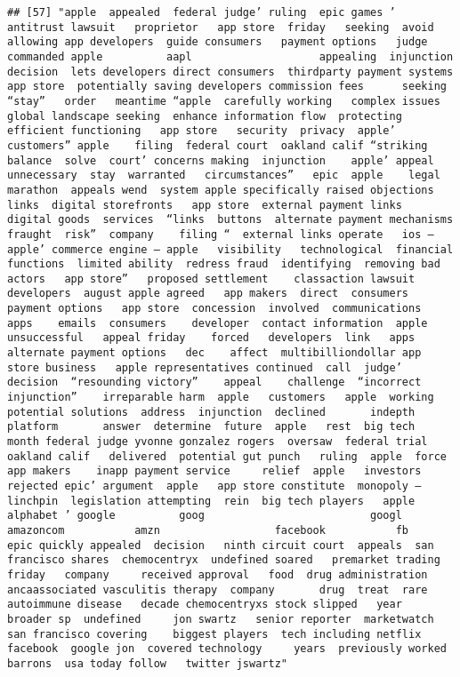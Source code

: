 \documentclass[
]{article}
\begin{document}
\begin{verbatim}
## [57] "apple  appealed  federal judge’ ruling  epic games ’ antitrust lawsuit   proprietor   app store  friday   seeking  avoid allowing app developers  guide consumers   payment options   judge commanded apple          aapl                    appealing  injunction   decision  lets developers direct consumers  thirdparty payment systems    app store  potentially saving developers commission fees      seeking  “stay”   order   meantime “apple  carefully working   complex issues   global landscape seeking  enhance information flow  protecting   efficient functioning   app store   security  privacy  apple’ customers” apple    filing  federal court  oakland calif “striking   balance  solve  court’ concerns making  injunction    apple’ appeal  unnecessary  stay  warranted   circumstances”   epic  apple    legal marathon  appeals wend  system apple specifically raised objections  links  digital storefronts   app store  external payment links  digital goods  services  “links  buttons  alternate payment mechanisms  fraught  risk”  company    filing “  external links operate   ios —   apple’ commerce engine — apple   visibility   technological  financial functions  limited ability  redress fraud  identifying  removing bad actors   app store”   proposed settlement    classaction lawsuit  developers  august apple agreed   app makers  direct  consumers  payment options   app store  concession  involved  communications   apps    emails  consumers    developer  contact information  apple  unsuccessful   appeal friday    forced   developers  link   apps  alternate payment options   dec    affect  multibilliondollar app store business   apple representatives continued  call  judge’ decision  “resounding victory”    appeal    challenge  “incorrect injunction”    irreparable harm  apple   customers   apple  working  potential solutions  address  injunction  declined       indepth    platform       answer  determine  future  apple   rest  big tech  month federal judge yvonne gonzalez rogers  oversaw  federal trial  oakland calif   delivered  potential gut punch   ruling  apple  force app makers    inapp payment service     relief  apple   investors  rejected epic’ argument  apple   app store constitute  monopoly —  linchpin  legislation attempting  rein  big tech players   apple alphabet ’ google          goog                          googl                 amazoncom           amzn                  facebook           fb                 epic quickly appealed  decision   ninth circuit court  appeals  san francisco shares  chemocentryx  undefined soared   premarket trading  friday   company     received approval   food  drug administration   ancaassociated vasculitis therapy  company       drug  treat  rare autoimmune disease   decade chemocentryxs stock slipped   year   broader sp  undefined     jon swartz   senior reporter  marketwatch  san francisco covering    biggest players  tech including netflix facebook  google jon  covered technology     years  previously worked  barrons  usa today follow   twitter jswartz"                                                                                                                                                                                                                                                                            
\end{verbatim}
\end{document}
